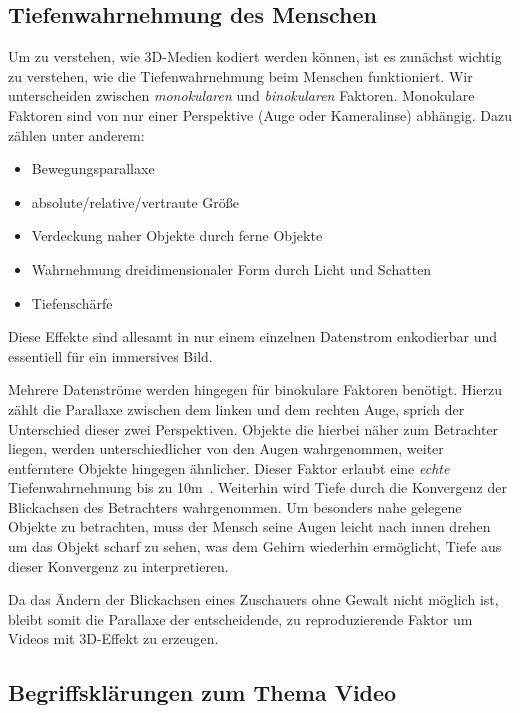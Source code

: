 \subsection{Tiefenwahrnehmung des Menschen}\label{subsec:depth-percept}
Um zu verstehen, wie 3D-Medien kodiert werden k\"onnen, ist es zun\"achst wichtig zu verstehen, wie die Tiefenwahrnehmung
beim Menschen funktioniert.
Wir unterscheiden zwischen \textit{monokularen} und \textit{binokularen} Faktoren.
Monokulare Faktoren sind von nur einer Perspektive (Auge oder Kameralinse) abh\"angig.
Dazu z\"ahlen unter anderem\cite{depth-perception}:
\begin{itemize}
    \item Bewegungsparallaxe
    \item absolute/relative/vertraute Gr\"oße
    \item Verdeckung naher Objekte durch ferne Objekte
    \item Wahrnehmung dreidimensionaler Form durch Licht und Schatten
    \item Tiefensch\"arfe
\end{itemize}
Diese Effekte sind allesamt in nur einem einzelnen Datenstrom enkodierbar und essentiell f\"ur ein immersives Bild.

\noindent\newline Mehrere Datenstr\"ome werden hingegen f\"ur binokulare Faktoren ben\"otigt.
Hierzu z\"ahlt die Parallaxe zwischen dem linken und dem rechten Auge, sprich der Unterschied dieser zwei Perspektiven.
Objekte die hierbei n\"aher zum Betrachter liegen, werden unterschiedlicher von den Augen wahrgenommen, weiter entferntere
Objekte hingegen \"ahnlicher.
Dieser Faktor erlaubt eine \textit{echte} Tiefenwahrnehmung bis zu 10m~\cite{depth-perception}.
Weiterhin wird Tiefe durch die Konvergenz der Blickachsen des Betrachters wahrgenommen.
Um besonders nahe gelegene Objekte zu betrachten, muss der Mensch seine Augen leicht nach innen drehen um das Objekt
scharf zu sehen, was dem Gehirn wiederhin erm\"oglicht, Tiefe aus dieser Konvergenz zu interpretieren.

\noindent\newline Da das \"Andern der Blickachsen eines Zuschauers ohne Gewalt nicht m\"oglich ist, bleibt somit die
Parallaxe der entscheidende, zu reproduzierende Faktor um Videos mit 3D-Effekt zu erzeugen.


\subsection{Begriffskl\"arungen zum Thema Video}\label{subsec:video-terms}
